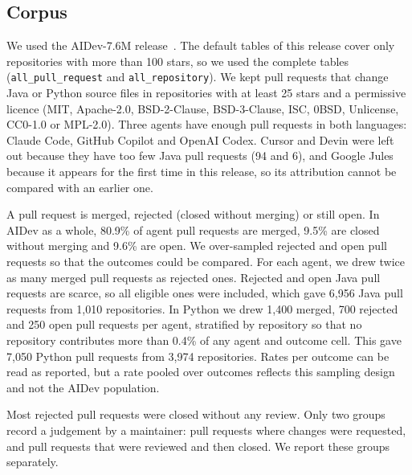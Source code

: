 \documentclass[sigconf]{acmart}
\begin{document}
\subsection{Corpus}
\label{sec:corpus}

We used the AIDev-7.6M release~\cite{li2025aidev}. The default tables of this release cover only
repositories with more than 100 stars, so we used the complete tables (\texttt{all\_pull\_request}
and \texttt{all\_repository}). We kept pull requests that change Java or Python source files in
repositories with at least 25 stars and a permissive licence (MIT, Apache-2.0, BSD-2-Clause,
BSD-3-Clause, ISC, 0BSD, Unlicense, CC0-1.0 or MPL-2.0). Three agents have enough pull requests in
both languages: Claude Code, GitHub Copilot and OpenAI Codex. Cursor and Devin were left out because
they have too few Java pull requests (94 and 6), and Google Jules because it appears for the first
time in this release, so its attribution cannot be compared with an earlier one.

A pull request is merged, rejected (closed without merging) or still open. In AIDev as a whole,
80.9\% of agent pull requests are merged, 9.5\% are closed without merging and 9.6\% are open. We
over-sampled rejected and open pull requests so that the outcomes could be compared. For each agent,
we drew twice as many merged pull requests as rejected ones. Rejected and open Java pull requests are
scarce, so all eligible ones were included, which gave 6,956 Java pull requests from 1,010
repositories. In Python we drew 1,400 merged, 700 rejected and 250 open pull requests per agent,
stratified by repository so that no repository contributes more than 0.4\% of any agent and outcome
cell. This gave 7,050 Python pull requests from 3,974 repositories. Rates per outcome can be read as
reported, but a rate pooled over outcomes reflects this sampling design and not the AIDev population.

Most rejected pull requests were closed without any review. Only two groups record a judgement by a
maintainer: pull requests where changes were requested, and pull requests that were reviewed and then
closed. We report these groups separately.
\end{document}
